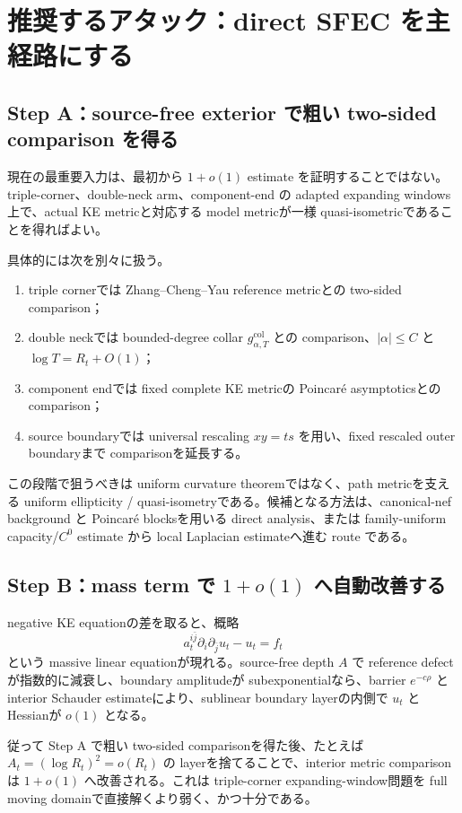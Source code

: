 \documentclass[11pt,a4paper]{ltjsarticle}
\theoremstyle{plain}
\theoremstyle{definition}
\theoremstyle{remark}
\begin{document}
\section{推奨するアタック：direct SFEC を主経路にする}\label{sec:attack-v21}

\subsection{Step A：source-free exterior で粗い two-sided comparison を得る}
現在の最重要入力は、最初から $1+o(1)$ estimate を証明することではない。triple-corner、double-neck arm、component-end の adapted expanding windows 上で、actual KE metricと対応する model metricが一様 quasi-isometricであることを得ればよい。

具体的には次を別々に扱う。
\begin{enumerate}[label=(A\arabic*)]
\item triple cornerでは Zhang--Cheng--Yau reference metricとの two-sided comparison；
\item double neckでは bounded-degree collar $g^{\mathrm{col}}_{\alpha,T}$ との comparison、$|\alpha|\le C$ と $\log T=R_t+O(1)$；
\item component endでは fixed complete KE metricの Poincaré asymptoticsとの comparison；
\item source boundaryでは universal rescaling $xy=ts$ を用い、fixed rescaled outer boundaryまで comparisonを延長する。
\end{enumerate}

この段階で狙うべきは uniform curvature theoremではなく、path metricを支える uniform ellipticity / quasi-isometryである。候補となる方法は、canonical-nef background と Poincaré blocksを用いる direct analysis、または family-uniform capacity/$C^0$ estimate から local Laplacian estimateへ進む route である。

\subsection{Step B：mass term で $1+o(1)$ へ自動改善する}
negative KE equationの差を取ると、概略
\[
 a_t^{i\bar j}\partial_i\partial_{\bar j}u_t-u_t=f_t
\]
という massive linear equationが現れる。source-free depth $A$ で reference defectが指数的に減衰し、boundary amplitudeが subexponentialなら、barrier $e^{-c\rho}$ と interior Schauder estimateにより、sublinear boundary layerの内側で $u_t$ と Hessianが $o(1)$ となる。

従って Step A で粗い two-sided comparisonを得た後、たとえば $A_t=(\log R_t)^2=o(R_t)$ の layerを捨てることで、interior metric comparisonは $1+o(1)$ へ改善される。これは triple-corner expanding-window問題を full moving domainで直接解くより弱く、かつ十分である。
\end{document}
